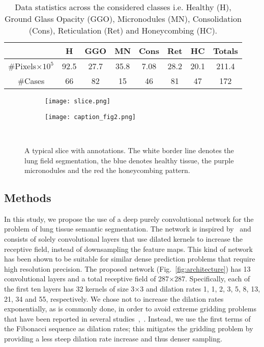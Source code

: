 \documentclass[journal]{IEEEtran}
\begin{document}
\begin{table}
\centering
\caption{Data statistics across the considered classes i.e. Healthy (H), Ground Glass Opacity (GGO), Micronodules (MN), Consolidation (Cons), Reticulation (Ret) and Honeycombing (HC).}
\label{tab:db-stats}
\begin{tabular}{@{}cccccccc@{}}
\toprule
~ & H     & GGO   & MN    & Cons & Ret    & HC    & Totals\\ 
\midrule
\#Pixels$\times10^{5}$  & 92.5  & 27.7  & 35.8  & 7.08 & 28.2   & 20.1  & 211.4\\ 
\#Cases        & 66    & 82    & 15    & 46   & 81     & 47    & 172\\
\bottomrule
\end{tabular}
\end{table}\begin{figure}

    \centering
        \begin{subfigure}{3.2in}
        \texttt{[image: slice.png]}
    \end{subfigure}
    \par\medskip
    \begin{subfigure}{2.5in}
        \centering
        \texttt{[image: caption\_fig2.png]}
    \end{subfigure}
    ~
    
    \caption{A typical slice with annotations. The white border line denotes the lung field segmentation, the blue denotes healthy tissue, the purple micronodules and the red the honeycombing pattern.}
    \label{fig:slice}
\end{figure}\subsection{Methods}
In this study, we propose the use of a deep purely convolutional network for the problem of lung tissue semantic segmentation. The network is inspired by~\cite{YuDilatedSegm} and consists of solely convolutional layers that use dilated kernels to increase the receptive field, instead of downsampling the feature maps. This kind of network has been shown to be suitable for similar dense prediction problems that require high resolution precision. The proposed network (Fig.~\ref{fig:architecture}) has 13 convolutional layers and a total receptive field of 287$\times$287. Specifically, each of the first ten layers has 32 kernels of size 3$\times$3 and dilation rates 1, 1, 2, 3, 5, 8, 13, 21, 34 and 55, respectively. We chose not to increase the dilation rates exponentially, as is commonly done, in order to avoid extreme gridding problems that have been reported in several studies~\cite{WangCYLHHC17},~\cite{YuKF17}. Instead, we use the first terms of the Fibonacci sequence as dilation rates; this mitigates the gridding problem by providing a less steep dilation rate increase and thus denser sampling.
\end{document}
